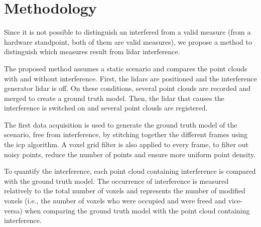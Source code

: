 \documentclass[extendedabs]{recpad2k}
\begin{document}
\section{Methodology}
\label{sec:methodology}
Since it is not possible to distinguish an interfered from a valid measure (from a hardware standpoint, both of them are valid measures), we propose a method to distinguish which measures result from \gls{lidar} interference.

The proposed method assumes a static scenario and compares the point clouds with and without interference. First, the \gls{lidar}s are positioned and the interference generator \gls{lidar} is off. On these conditions, several point clouds are recorded and merged to create a ground truth model. Then, the \gls{lidar} that causes the interference is switched on and several point clouds are registered.

The first data acquisition is used to generate the ground truth model of the scenario, free from interference, by stitching together the different frames using the \gls{icp} algorithm. A voxel grid filter is also applied to every frame, to filter out noisy points, reduce the number of points and ensure more uniform point density.





To quantify the interference, each point cloud containing interference is compared with the ground truth model.
The occurrence of interference is measured relatively to the total number of voxels and represents the number of modified voxels (i.e., the number of voxels who were occupied and were freed and vice-versa) when comparing the ground truth model with the point cloud containing interference.
\end{document}
